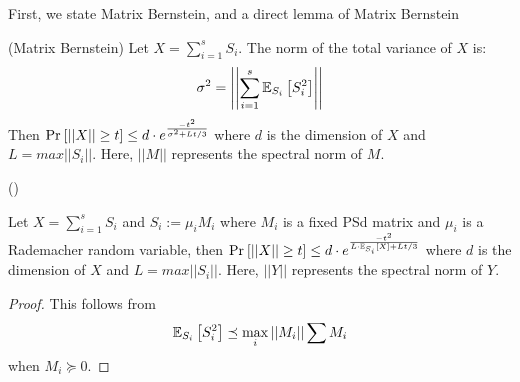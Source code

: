   First, we state Matrix Bernstein, and a direct lemma of Matrix Bernstein  
  \begin{theorem} (Matrix Bernstein)
    Let $X = \sum_{i=1}^s S_i$. The norm of the total variance of $X$ is:
    \begin{align}
      \sigma^2 = \left| \left| \sum_{i=1}^s {\mathbb{E}}_{S_i}\left[ S_i^2 \right] \right| \right|
    \end{align}
    Then $\mbox{Pr}_{}\left[ ||X|| \geq t \right] \leq d \cdot e^{\frac{-t^2}{\sigma^2 + Lt/3}}$
    where $d$ is the dimension of $X$ and $L = max||S_i||$. Here, $||M ||$ represents the spectral norm of $M$.

    ()
  \end{theorem}
  \begin{lemma} \label{lem:matrix-azuma}
    Let $X = \sum_{i=1}^s S_i$ and $S_i := \mu_i M_i$ where $M_i$ is a fixed PSd matrix and
    $\mu_i$ is a Rademacher random variable, 
    then $\mbox{Pr}_{}\left[ ||X|| \geq t \right] \leq d \cdot e^{\frac{-t^2}{L \cdot {\mathbb{E}}_{S_i}\left[ X \right]+ Lt/3}}$
    where $d$ is the dimension of $X$ and $L = max||S_i||$.
    Here, $||Y ||$ represents the spectral norm of $Y$.
  \end{lemma}
  \begin{proof} This follows from
    \begin{align}
    {\mathbb{E}}_{S_i}\left[ S_i^2 \right] \preceq \max_{i}||M_i|| \sum{M_i} 
    \end{align}
    when $M_i \succeq 0$.

  \end{proof}

